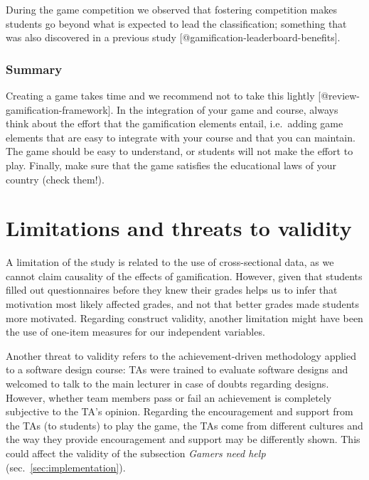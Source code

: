 \documentclass[
]{article}
\begin{document}
During the game competition we observed that fostering competition makes
students go beyond what is expected to lead the classification;
something that was also discovered in a previous study
{[}@gamification-leaderboard-benefits{]}.

\hypertarget{summary}{%
\subsubsection*{Summary}\label{summary}}

Creating a game takes time and we recommend not to take this lightly
{[}@review-gamification-framework{]}. In the integration of your game
and course, always think about the effort that the gamification elements
entail, i.e.~adding game elements that are easy to integrate with your
course and that you can maintain. The game should be easy to understand,
or students will not make the effort to play. Finally, make sure that
the game satisfies the educational laws of your country (check them!).

\hypertarget{limitations-and-threats-to-validity}{%
\section{Limitations and threats to
validity}\label{limitations-and-threats-to-validity}}

A limitation of the study is related to the use of cross-sectional data,
as we cannot claim causality of the effects of gamification. However,
given that students filled out questionnaires before they knew their
grades helps us to infer that motivation most likely affected grades,
and not that better grades made students more motivated. Regarding
construct validity, another limitation might have been the use of
one-item measures for our independent variables.

Another threat to validity refers to the achievement-driven methodology
applied to a software design course: TAs were trained to evaluate
software designs and welcomed to talk to the main lecturer in case of
doubts regarding designs. However, whether team members pass or fail an
achievement is completely subjective to the TA's opinion. Regarding the
encouragement and support from the TAs (to students) to play the game,
the TAs come from different cultures and the way they provide
encouragement and support may be differently shown. This could affect
the validity of the subsection \textit{Gamers need help}
(sec.~\ref{sec:implementation}).
\end{document}
